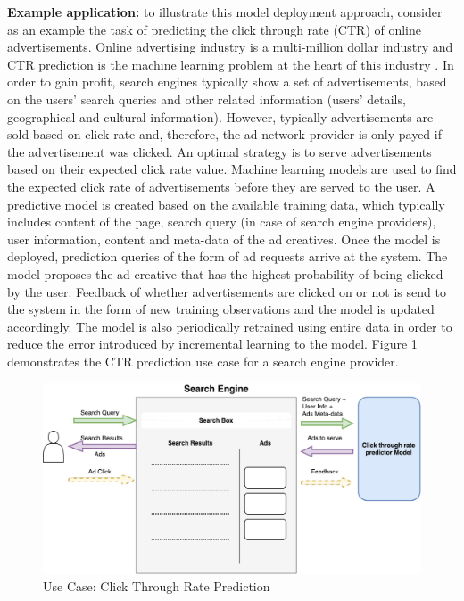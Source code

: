 \documentclass{vldb}
\begin{document}
\textbf{Example application:} to illustrate this model deployment approach, consider as an example the task of predicting the click through rate (CTR) of online advertisements.
Online advertising industry is a multi-million dollar industry and CTR prediction is the machine learning problem at the heart of this industry \cite{macmahan2013, graepel2010web} .
In order to gain profit, search engines typically show a set of advertisements, based on the users' search queries and other related information (users' details, geographical and cultural information).
However, typically advertisements are sold based on click rate and, therefore, the ad network provider is only payed if the advertisement was clicked.
An optimal strategy is to serve advertisements based on their expected click rate value.
Machine learning models are used to find the expected click rate of advertisements before they are served to the user.
A predictive model is created based on the available training data, which typically includes content of the page, search query (in case of search engine providers), user information, content and meta-data of the ad creatives. 
Once the model is deployed, prediction queries of the form of ad requests arrive at the system.
The model proposes the ad creative that has the highest probability of being clicked by the user.
Feedback of whether advertisements are clicked on or not is send to the system in the form of new training observations and the model is updated accordingly.
The model is also periodically retrained using entire data in order to reduce the error introduced by incremental learning to the model.
Figure \ref{fig:click-rate} demonstrates the CTR prediction use case for a search engine provider.

\begin{figure}[h]
\centering
\includegraphics[width=\columnwidth]{../images/use-case-1.pdf}
\caption{Use Case: Click Through Rate Prediction}
\label{fig:click-rate}
\end{figure}
\end{document}
